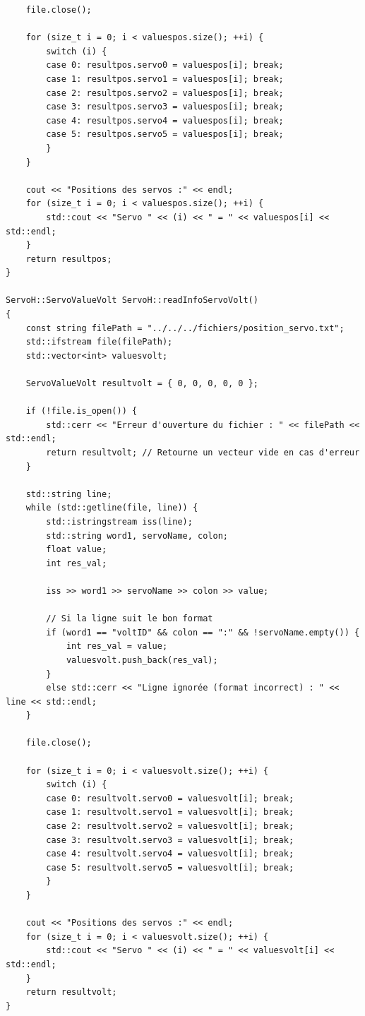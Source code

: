 \documentclass[main.tex]{subfiles}
\begin{document}
\begin{lstlisting}
    file.close();

    for (size_t i = 0; i < valuespos.size(); ++i) {
        switch (i) {
        case 0: resultpos.servo0 = valuespos[i]; break;
        case 1: resultpos.servo1 = valuespos[i]; break;
        case 2: resultpos.servo2 = valuespos[i]; break;
        case 3: resultpos.servo3 = valuespos[i]; break;
        case 4: resultpos.servo4 = valuespos[i]; break;
        case 5: resultpos.servo5 = valuespos[i]; break;
        }
    }

    cout << "Positions des servos :" << endl;
    for (size_t i = 0; i < valuespos.size(); ++i) {
        std::cout << "Servo " << (i) << " = " << valuespos[i] << std::endl;
    }
    return resultpos;
}

ServoH::ServoValueVolt ServoH::readInfoServoVolt()
{
    const string filePath = "../../../fichiers/position_servo.txt";
    std::ifstream file(filePath);
    std::vector<int> valuesvolt;

    ServoValueVolt resultvolt = { 0, 0, 0, 0, 0 };

    if (!file.is_open()) {
        std::cerr << "Erreur d'ouverture du fichier : " << filePath << std::endl;
        return resultvolt; // Retourne un vecteur vide en cas d'erreur
    }

    std::string line;
    while (std::getline(file, line)) {
        std::istringstream iss(line);
        std::string word1, servoName, colon;
        float value;
        int res_val;

        iss >> word1 >> servoName >> colon >> value;

        // Si la ligne suit le bon format
        if (word1 == "voltID" && colon == ":" && !servoName.empty()) {
            int res_val = value;
            valuesvolt.push_back(res_val);
        }
        else std::cerr << "Ligne ignorée (format incorrect) : " << line << std::endl;
    }

    file.close();

    for (size_t i = 0; i < valuesvolt.size(); ++i) {
        switch (i) {
        case 0: resultvolt.servo0 = valuesvolt[i]; break;
        case 1: resultvolt.servo1 = valuesvolt[i]; break;
        case 2: resultvolt.servo2 = valuesvolt[i]; break;
        case 3: resultvolt.servo3 = valuesvolt[i]; break;
        case 4: resultvolt.servo4 = valuesvolt[i]; break;
        case 5: resultvolt.servo5 = valuesvolt[i]; break;
        }
    }

    cout << "Positions des servos :" << endl;
    for (size_t i = 0; i < valuesvolt.size(); ++i) {
        std::cout << "Servo " << (i) << " = " << valuesvolt[i] << std::endl;
    }
    return resultvolt;
}


\end{lstlisting}
\end{document}

